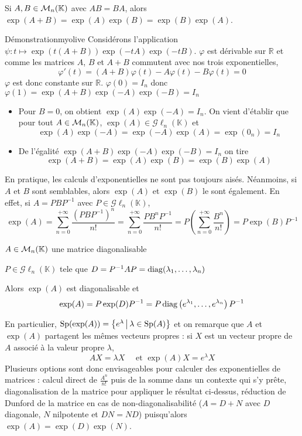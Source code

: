     \begin{prop}{}{}
        Si $A,B \in \mathcal{M}_{n}(\mathbb{K})$ avec $AB = BA$, alors $\exp(A+B) = \exp(A)\exp(B) = \exp(B)\exp(A)$.
    \end{prop}

    \begin{demo}{Démonstration}{myolive}
        Considérons l’application $\psi : t \mapsto \exp(t(A+B))\exp(-tA)\exp(-tB)$. $\varphi$ est dérivable sur $\mathbb{R}$ et comme les matrices $A$, $B$ et $A+B$ commutent avec nos trois exponentielles, 
        \[ \varphi'(t) = (A+B)\varphi(t) - A\varphi(t) - B\varphi(t) = 0 \] 
        $\varphi$ est donc constante sur $\mathbb{R}$. $\varphi(0)=I_n$ donc $\varphi(1) = \exp(A+B)\exp(-A)\exp(-B) = I_n$
        \begin{itemize}
            \item Pour $B = 0$, on obtient $\exp(A)\exp(-A) = I_n$. On vient d’établir que pour tout $A \in \mathcal{M}_{n}(\mathbb{K})$, $\exp(A) \in \mathcal{G}\ell_n(\mathbb{K})$ et 
            \[ \exp(A)\exp(-A) = \exp(-A)\exp(A) = \exp(0_n) = I_n \] 
            \item De l’égalité $\exp(A+B)\exp(-A)\exp(-B) = I_n$ on tire 
            \[ \exp(A+B) = \exp(A)\exp(B) = \exp(B)\exp(A) \]
        \end{itemize}
    \end{demo}

    En pratique, les calculs d’exponentielles ne sont pas toujours aisés. Néanmoins, si $A$ et $B$ sont semblables, alors $\exp(A)$ et $\exp(B)$ le sont également. En effet, si $A = P B P^{-1}$ avec $P \in \mathcal{G}\ell_n(\mathbb{K})$, 
    \[ \exp(A) = \sum\limits_{n=0}^{+\infty} \frac{(PBP^{-1})^n}{n!} = \sum\limits_{n=0}^{+\infty} \frac{PB^nP^{-1}}{n!} = P \left(\sum\limits_{n=0}^{+\infty} \frac{B^n}{n!}\right) = P \exp(B) P^{-1} \] 

    \begin{prop}{}{}
        \begin{soient}
            \item $A \in \mathcal{M}_{n}(\mathbb{K})$ une matrice diagonalisable 
            \item $P \in \mathcal{G}\ell_n(\mathbb{K})$ tele que $D = P^{-1} A P = \operatorname{diag}(\lambda_1,\ldots,\lambda_n)$
        \end{soient}
        Alors $\exp(A)$ est diagonalisable et 
        \[ \exp(A) = P \exp(D) P^{-1} = P \operatorname{diag}\left(e^{\lambda_1},\ldots, e^{\lambda_n}\right) P^{-1} \]
    \end{prop}

    En particulier, $\operatorname{Sp}(\exp(A)) = \left\{e^{\lambda} \, \middle| \, \lambda \in \operatorname{Sp}(A)\right\}$ et on remarque que $A$ et $\exp(A)$ partagent les mêmes vecteurs propres : si $X$ est un vecteur propre de $A$ associé à la valeur propre $\lambda$, 
    \[ AX = \lambda X \quad \text{ et } \exp(A) X = e^{\lambda} X \] 
    Plusieurs options sont donc envisageables pour calculer des exponentielles de matrices : calcul direct de $\frac{A^n}{n!}$ puis de la somme dans un contexte qui s’y prête, diagonalisation de la matrice pour appliquer le résultat ci-dessus, réduction de Dunford de la matrice en cas de non-diagonalisabilité ($A = D + N$ avec $D$ diagonale, $N$ nilpotente et $D N = N D$) puisqu’alors $\exp(A) = \exp(D) \exp(N)$.

